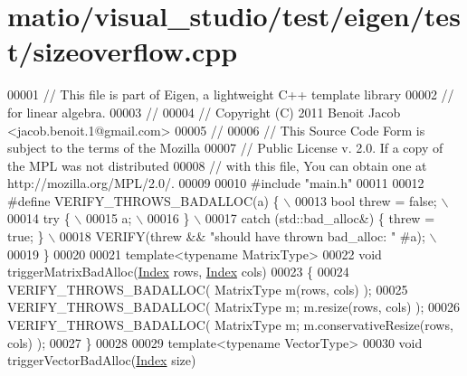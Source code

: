 \hypertarget{matio_2visual__studio_2test_2eigen_2test_2sizeoverflow_8cpp_source}{}\section{matio/visual\+\_\+studio/test/eigen/test/sizeoverflow.cpp}
\label{matio_2visual__studio_2test_2eigen_2test_2sizeoverflow_8cpp_source}

\begin{DoxyCode}
00001 \textcolor{comment}{// This file is part of Eigen, a lightweight C++ template library}
00002 \textcolor{comment}{// for linear algebra.}
00003 \textcolor{comment}{//}
00004 \textcolor{comment}{// Copyright (C) 2011 Benoit Jacob <jacob.benoit.1@gmail.com>}
00005 \textcolor{comment}{//}
00006 \textcolor{comment}{// This Source Code Form is subject to the terms of the Mozilla}
00007 \textcolor{comment}{// Public License v. 2.0. If a copy of the MPL was not distributed}
00008 \textcolor{comment}{// with this file, You can obtain one at http://mozilla.org/MPL/2.0/.}
00009 
00010 \textcolor{preprocessor}{#include "main.h"}
00011 
00012 \textcolor{preprocessor}{#define VERIFY\_THROWS\_BADALLOC(a) \{                           \(\backslash\)}
00013 \textcolor{preprocessor}{    bool threw = false;                                       \(\backslash\)}
00014 \textcolor{preprocessor}{    try \{                                                     \(\backslash\)}
00015 \textcolor{preprocessor}{      a;                                                      \(\backslash\)}
00016 \textcolor{preprocessor}{    \}                                                         \(\backslash\)}
00017 \textcolor{preprocessor}{    catch (std::bad\_alloc&) \{ threw = true; \}                 \(\backslash\)}
00018 \textcolor{preprocessor}{    VERIFY(threw && "should have thrown bad\_alloc: " #a);     \(\backslash\)}
00019 \textcolor{preprocessor}{  \}}
00020 
00021 \textcolor{keyword}{template}<\textcolor{keyword}{typename} MatrixType>
00022 \textcolor{keywordtype}{void} triggerMatrixBadAlloc(\hyperlink{namespace_eigen_a62e77e0933482dafde8fe197d9a2cfde}{Index} rows, \hyperlink{namespace_eigen_a62e77e0933482dafde8fe197d9a2cfde}{Index} cols)
00023 \{
00024   VERIFY\_THROWS\_BADALLOC( MatrixType m(rows, cols) );
00025   VERIFY\_THROWS\_BADALLOC( MatrixType m; m.resize(rows, cols) );
00026   VERIFY\_THROWS\_BADALLOC( MatrixType m; m.conservativeResize(rows, cols) );
00027 \}
00028 
00029 \textcolor{keyword}{template}<\textcolor{keyword}{typename} VectorType>
00030 \textcolor{keywordtype}{void} triggerVectorBadAlloc(\hyperlink{namespace_eigen_a62e77e0933482dafde8fe197d9a2cfde}{Index} size)

\end{DoxyCode}
